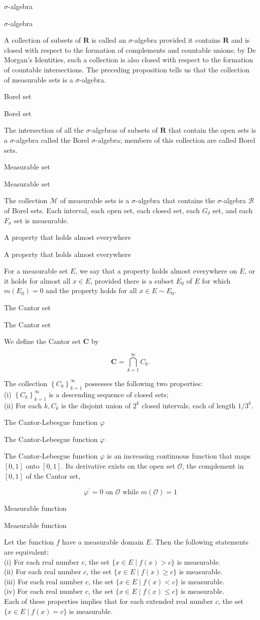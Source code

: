 \documentclass[17pt]{extarticle}
\newcommand{\boxset}[2]{\begin{mdframed}[style=darkQuesion]
#1
\end{mdframed}
\newpage
\begin{mdframed}[style=darkQuesion]
#1
  \end{mdframed}
\begin{mdframed}[style=darkAnswer]
#2
  \end{mdframed}
  \newpage
}
\begin{document}
\boxset{$\sigma$-algebra}
{
A collection of subsets of $\mathbf{R}$ is called an $\sigma$-algebra provided it contains $\mathbf{R}$ and is closed with respect to the formation of complements and countable unions; by De Morgan's Identities, such a collection is also closed with respect to the formation of countable intersections. The preceding proposition tells us that the collection of measurable sets is a $\sigma$-algebra.
}
\boxset{Borel set}
{
The intersection of all the $\sigma$-algebras of subsets of $\mathbf{R}$ that contain the open sets is a $\sigma$-algebra called the Borel $\sigma$-algebra; members of this collection are called Borel sets.
}
\boxset{Measurable set}
{
The collection $\mathcal{M}$ of measurable sets is a $\sigma$-algebra that contains the $\sigma$-algebra $\mathcal{B}$ of Borel sets. Each interval, each open set, each closed set, each $G_{\delta}$ set, and each $F_{\sigma}$ set is measurable.
}
\boxset{A property that holds almost everywhere}
{
For a measurable set $E$, we say that a property holds almost everywhere on $E$, or it holds for almost all $x \in E$, provided there is a subset $E_{0}$ of $E$ for which $m\left(E_{0}\right)=0$ and the property holds for all $x \in E \sim E_{0}$.
}
\boxset{The Cantor set}
{
We define the Cantor set $\mathbf{C}$ by

\[
\mathbf{C}=\bigcap_{k=1}^{\infty} C_{k} .
\]

The collection $\left\{C_{k}\right\}_{k=1}^{\infty}$ possesses the following two properties:\[\ \]
(i) $\left\{C_{k}\right\}_{k=1}^{\infty}$ is a descending sequence of closed sets;\[\ \]
(ii) For each $k, C_{k}$ is the disjoint union of $2^{k}$ closed intervals, each of length $1 / 3^{k}$.
}
\boxset{The Cantor-Lebesgue function $\varphi$}
{
The Cantor-Lebesgue function $\varphi$ is an increasing continuous function that maps $[0,1]$ onto $[0,1]$. Its derivative exists on the open set $\mathcal{O}$, the complement in $[0,1]$ of the Cantor set,

\[
\varphi^{\prime}=0 \text { on } \mathcal{O} \text { while } m(\mathcal{O})=1
\]

}
\boxset{Measurable function}
{
Let the function $f$ have a measurable domain $E$. Then the following statements are equivalent:\[\ \]
(i) For each real number $c$, the set $\{x \in E \mid f(x)>c\}$ is measurable.\[\ \]
(ii) For each real number $c$, the set $\{x \in E \mid f(x) \geq c\}$ is measurable.\[\ \]
(iii) For each real number $c$, the set $\{x \in E \mid f(x)<c\}$ is measurable.\[\ \]
(iv) For each real number $c$, the set $\{x \in E \mid f(x) \leq c\}$ is measurable.\[\ \]
Each of these properties implies that for each extended real number $c$, the set $\{x \in E \mid f(x)=c\}$ is measurable.
}
\end{document}
